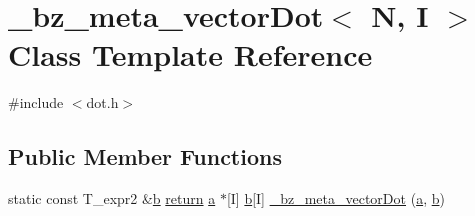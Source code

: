 \hypertarget{class__bz__meta__vectorDot}{}\section{\+\_\+bz\+\_\+meta\+\_\+vector\+Dot$<$ N, I $>$ Class Template Reference}
\label{class__bz__meta__vectorDot}


{\ttfamily \#include $<$dot.\+h$>$}

\subsection*{Public Member Functions}
\begin{DoxyCompactItemize}
\item 
static const T\+\_\+expr2 \&\hyperlink{class__bz__meta__vectorDot_ad7f93a12572bd4ece39058b28b9fb05e}{b} \hyperlink{stencilops_8h_afee67e5c8680c1bb9a8cb7bef7bfcc55}{return} \hyperlink{gen__mat5files_8m_aae328bf20413f220e38aec4d95bfd6da}{a} $\ast$\mbox{[}I\mbox{]} \hyperlink{class__bz__meta__vectorDot_ad7f93a12572bd4ece39058b28b9fb05e}{b}\mbox{[}I\mbox{]} \hyperlink{class__bz__meta__vectorDot_af01ef4915c026831cc9b385df7691c4e}{\+\_\+bz\+\_\+meta\+\_\+vector\+Dot} (\hyperlink{gen__mat5files_8m_aae328bf20413f220e38aec4d95bfd6da}{a}, \hyperlink{class__bz__meta__vectorDot_ad7f93a12572bd4ece39058b28b9fb05e}{b})
\end{DoxyCompactItemize}
